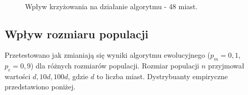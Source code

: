\documentclass[12pt, a4paper]{article}
\begin{document}
\begin{figure}[H]
\centering
\mbox{\quad
{} 
}
\caption{Wpływ krzyżowania na działanie algorytmu - 48 miast.}
\end{figure}

\subsection{Wpływ rozmiaru populacji}

Przetestowano jak zmianiają się wyniki algorytmu ewolucyjnego ($p_m=0,1$, $p_c=0,9$)
dla różnych rozmiarów populacji. Rozmiar populacji $n$ przyjmował wartości $d, 10d, 100d$, gdzie $d$
to liczba miast. Dystrybuanty empiryczne przedstawiono poniżej.
\end{document}

